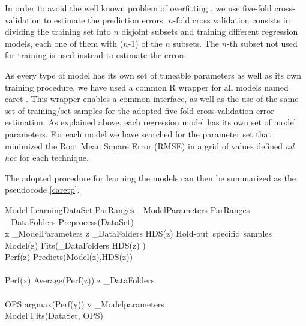 In order to avoid the well known problem of overfitting \cite[see
e.g.][]{Dietterich:1995:OUM:212094.212114}, we use five-fold
cross-validation to estimate the prediction errors. $n$-fold cross
validation consists in dividing the training set into $n$ disjoint
subsets and training different regression models, each one of them
with ($n$-1) of the $n$ subsets. The $n$-th subset not used for
training is used instead to estimate the errors.

As every type of model has its own set of tuneable parameters as well
as its own training procedure, we have used a common {\sc R}
\citep{R2016} wrapper for all models named {\sc caret} \citep[short for
Classification And REgression Training][]{caret}.  This wrapper
enables a common interface, as well as the use of the same set of
training/set samples for the adopted five-fold cross-validation error
estimation. As explained above, each regression model has its own set
of model parameters. For each model we have searched for the parameter
set that minimized the Root Mean Square Error (RMSE) in a grid of
values defined {\it ad hoc} for each technique.

The adopted procedure for learning the models can then be summarized
as the pseudocode \ref{caretp}. 

\begin{pseudocode}[plain]{Model Learning}{DataSet,ParRanges}
\label{caretp}
 _{ModelParameters} \GETS ParRanges \\
 _{DataFolders} \GETS Preprocess(DataSet) \\ 
 \FOREACH x \in {}_{ModelParameters} \DO
  \BEGIN
    \FOREACH z \in {}_{DataFolders} \DO
      \BEGIN
	HDS(z) \GETS \mbox{Hold-out specific samples} \\
	Model(z) \GETS Fits(_{DataFolders} \setminus HDS(z) ) \\
	Perf(z) \GETS Predicts(Model(z),HDS(z)) \\
      \END \\
    Perf(x) \GETS Average(Perf(z)) \quad \forall z \in {}_{DataFolders} \\
  \END \\
  
  OPS \GETS argmax(Perf(y)) \quad \forall y \in {}_{Modelparameters} \\
  Model \GETS Fits(DataSet, OPS) \\
\end{pseudocode}

